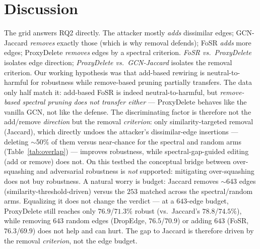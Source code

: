 \documentclass[11pt]{article}
\begin{document}
\section{Discussion}
The grid answers RQ2 directly. The attacker mostly \emph{adds} dissimilar edges; GCN-Jaccard \emph{removes}
exactly those (which is why removal defends); FoSR \emph{adds} more edges; ProxyDelete \emph{removes} edges by
a spectral criterion. \emph{FoSR vs.\ ProxyDelete} isolates edge direction; \emph{ProxyDelete vs.\
GCN-Jaccard} isolates the removal criterion. Our working hypothesis was that add-based rewiring is
neutral-to-harmful for robustness while remove-based pruning partially transfers. The data only half match
it: add-based FoSR is indeed neutral-to-harmful, but \emph{remove-based spectral pruning does not transfer
either} --- ProxyDelete behaves like the vanilla GCN, not like the defense. The discriminating factor is
therefore not the add/remove \emph{direction} but the removal \emph{criterion}: only similarity-targeted
removal (Jaccard), which directly undoes the attacker's dissimilar-edge insertions --- deleting
$\sim$50\% of them versus near-chance for the spectral and random arms (Table~\ref{tab:overlap}) ---
improves robustness, while spectral-gap-guided editing (add or remove) does not. On this testbed the conceptual bridge between
over-squashing and adversarial robustness is \emph{not} supported: mitigating over-squashing does not buy
robustness. A natural worry is budget: Jaccard removes $\sim$643 edges (similarity-threshold-driven)
versus the $253$ matched across the spectral/random arms. Equalizing it does not change the verdict ---
at a $643$-edge budget, ProxyDelete still reaches only $76.9$/$71.3\%$ robust (vs.\ Jaccard's
$78.8$/$74.5\%$), while removing $643$ random edges (DropEdge, $76.5$/$70.9$) or adding $643$ (FoSR,
$76.3$/$69.9$) does not help and can hurt. The gap to Jaccard is therefore driven by the removal
\emph{criterion}, not the edge budget.
\end{document}
